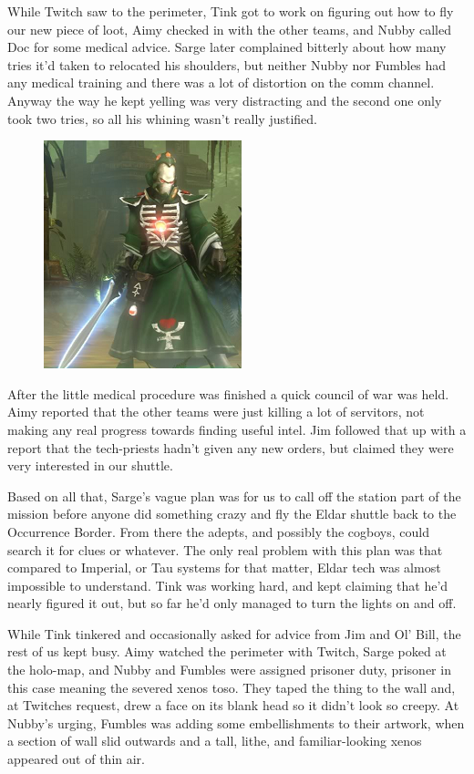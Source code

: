 While Twitch saw to the perimeter, Tink got to work on figuring out how to fly our new piece of loot, Aimy checked in with the other teams, and Nubby called Doc for some medical advice. 
Sarge later complained bitterly about how many tries it'd taken to relocated his shoulders, but neither Nubby nor Fumbles had any medical training and there was a lot of distortion on the comm channel. 
Anyway the way he kept yelling was very distracting and the second one only took two tries, so all his whining wasn't really justified.
\begin{figure}
	\begin{center}
		\includegraphics[width=\figwidth]{pics/11/57.png}
	\end{center}
\end{figure}
After the little medical procedure was finished a quick council of war was held. 
Aimy reported that the other teams were just killing a lot of servitors, not making any real progress towards finding useful intel. 
Jim followed that up with a report that the tech-priests hadn't given any new orders, but claimed they were very interested in our shuttle. 


Based on all that, Sarge's vague plan was for us to call off the station part of the mission before anyone did something crazy and fly the Eldar shuttle back to the Occurrence Border. 
From there the adepts, and possibly the cogboys, could search it for clues or whatever. 
The only real problem with this plan was that compared to Imperial, or Tau systems for that matter, Eldar tech was almost impossible to understand. 
Tink was working hard, and kept claiming that he'd nearly figured it out, but so far he'd only managed to turn the lights on and off.

While Tink tinkered and occasionally asked for advice from Jim and Ol' Bill, the rest of us kept busy. 
Aimy watched the perimeter with Twitch, Sarge poked at the holo-map, and Nubby and Fumbles were assigned prisoner duty, prisoner in this case meaning the severed xenos toso. 
They taped the thing to the wall and, at Twitches request, drew a face on its blank head so it didn't look so creepy. 
At Nubby's urging, Fumbles was adding some embellishments to their artwork, when a section of wall slid outwards and a tall, lithe, and familiar-looking xenos appeared out of thin air.

